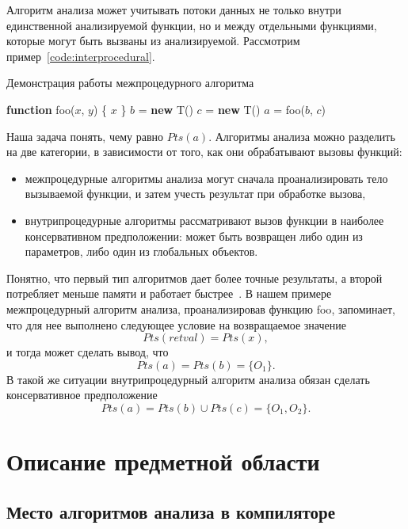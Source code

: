\documentclass[14pt,titlepage]{extarticle}
\newcommand{\NEW}{\textbf{new }}
\newcommand{\FUNCTION}{\textbf{function }}
\newcommand{\eng}[1]{{\English#1}}
\let\oldsection\section
\renewcommand{\section}{\newpage\oldsection}
\begin{document}
        Алгоритм анализа может учитывать потоки данных не только внутри
        единственной анализируемой функции, но и между отдельными функциями,
        которые могут быть вызваны из анализируемой.
        Рассмотрим пример~\ref{code:interprocedural}.
        \begin{algorithm}
          \caption{Демонстрация работы межпроцедурного алгоритма}
          \label{code:interprocedural}
          \begin{algorithmic}[1]
            \STATE \FUNCTION foo($x$, $y$) \{
            \RETURN $x$
            \STATE \}
            \STATE
            \STATE $b$ = \NEW T()
            \STATE $c$ = \NEW T()
            \STATE $a$ = foo($b$, $c$)
          \end{algorithmic}
        \end{algorithm}

        Наша задача понять, чему равно $Pts(a)$.
        Алгоритмы анализа можно разделить на две категории, в зависимости от
        того, как они обрабатывают вызовы функций:
        \begin{itemize}
          \item межпроцедурные алгоритмы анализа могут сначала проанализировать
                тело вызываемой функции, и затем учесть результат при обработке
                вызова,
          \item внутрипроцедурные алгоритмы рассматривают вызов функции в
                наиболее консервативном предположении: может быть возвращен
                либо один из параметров, либо один из глобальных объектов.
        \end{itemize}
        Понятно, что первый тип алгоритмов дает более точные результаты,
        а второй потребляет меньше памяти и работает
        быстрее~\cite[с.~117]{andersen}.
        В нашем примере межпроцедурный алгоритм анализа, проанализировав
        функцию \eng{foo}, запоминает, что для нее выполнено следующее условие
        на возвращаемое значение
        \[Pts(retval) = Pts(x),\]
        и тогда может сделать вывод, что \[Pts(a) = Pts(b) = \{O_1\}.\]
        В такой же ситуации внутрипроцедурный алгоритм анализа обязан сделать
        консервативное предположение
        \[Pts(a) = Pts(b) \cup Pts(c) = \{O_1, O_2\}.\]

  \section{Описание предметной области}

    \subsection{Место алгоритмов анализа в компиляторе}
\end{document}
